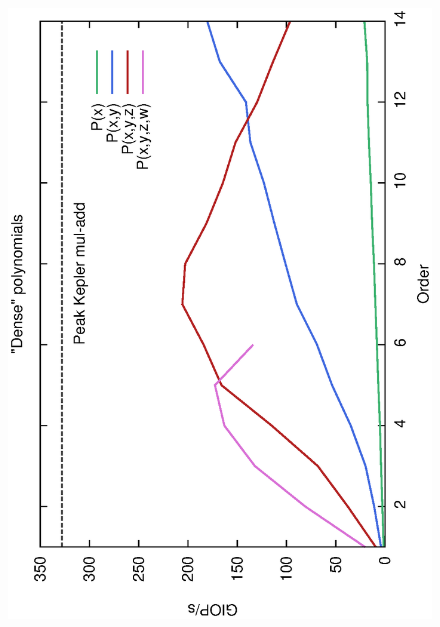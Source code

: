 \documentclass[oribibl]{llncs2e/llncs}
\begin{document}
\begin{itemize}
\begin{figure}[t!]
    \begin{center}
    \mbox{
        \hspace{-0.5cm}
        \includegraphics[scale=0.37, angle=-90]{ME128MIPS.eps} 
        \hspace{-0.4cm}
}
\end{center}
\end{figure}
\end{itemize}
\end{document}
